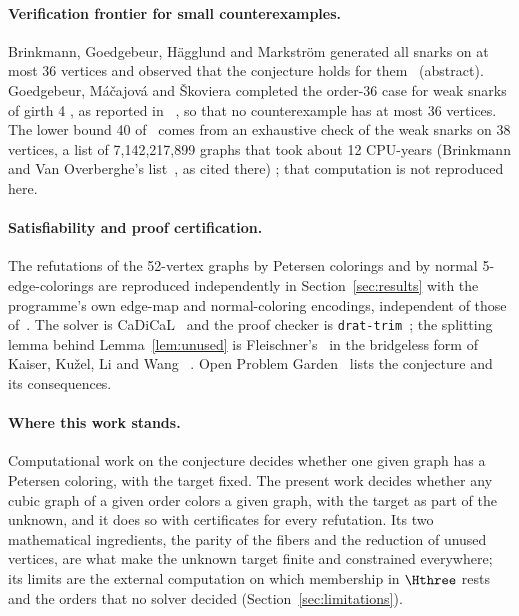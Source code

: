\paragraph{Verification frontier for small counterexamples.} Brinkmann, Goedgebeur, H\"agglund and
Markstr\"om generated all snarks on at most 36 vertices and observed that the conjecture holds for them~\cite{Brinkmann2013}
\evV{} (abstract). Goedgebeur, M\'a\v{c}ajov\'a and \v{S}koviera completed the order-36 case for weak snarks of girth 4
\cite{GMS2019}, as reported in~\cite{GJMMMU2026} \evU{}, so that no counterexample has at most 36 vertices. The lower bound 40 of~\cite{GJMMMU2026} comes
from an exhaustive check of the weak snarks on 38 vertices, a list of 7,142,217,899 graphs that took about 12 CPU-years
(Brinkmann and Van Overberghe's list~\cite{BrinkmannVO}, as cited there) \evV{}; that computation is not reproduced here.

\paragraph{Satisfiability and proof certification.} The refutations of the 52-vertex graphs by Petersen colorings
and by normal 5-edge-colorings are reproduced independently in Section~\ref{sec:results} with the programme's own edge-map and normal-coloring
encodings, independent of those of~\cite{Putman2026}. The solver is CaDiCaL~\cite{CaDiCaL} and the proof checker is
\texttt{drat-trim}~\cite{DRATtrim}; the splitting lemma behind Lemma~\ref{lem:unused} is Fleischner's~\cite{Fleischner1992} \evU{} in the
bridgeless form of Kaiser, Ku\v{z}el, Li and Wang~\cite{KaiserKLW2007} \evV{}. Open Problem Garden~\cite{OPG} \evV{} lists the conjecture and its
consequences.

\paragraph{Where this work stands.} Computational work on the conjecture decides whether one given graph has a
Petersen coloring, with the target fixed. The present work decides whether any cubic graph of a given order colors a given
graph, with the target as part of the unknown, and it does so with certificates for every refutation. Its two mathematical
ingredients, the parity of the fibers and the reduction of unused vertices, are what make the unknown target finite
and constrained everywhere; its limits are the external computation on which membership in $\Hthree$ rests and the orders
that no solver decided (Section~\ref{sec:limitations}).

